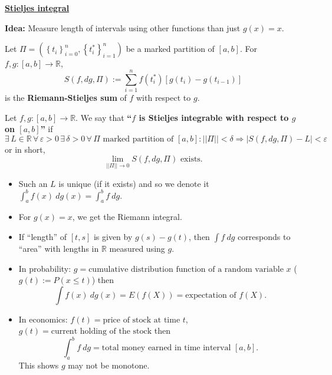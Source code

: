 \documentclass{notes}
\begin{document}
\newpage

{\boldmath \bfseries \underline{Stieljes integral}}

{\boldmath \bfseries Idea:} Measure length of intervals using other functions than just $g(x) = x$.

\begin{defn}
  Let $\Pi = (\left \{ t_i \right \}_{i = 0}^n, \left \{ t^*_i \right \}_{i = 1}^n)$ be a marked partition of $[a, b]$.
  For $f, g \colon [a, b] \to \mathbb R$, 
  \[
    S(f, dg, \Pi) := \sum_{i = 1}^n f(t^*_i) [g(t_i) - g(t_{i - 1})]
  \]
  is the {\boldmath \bfseries Riemann-Stieljes sum} of $f$ with respect to $g$.
\end{defn}

\begin{defn}
  Let $f, g \colon [a, b] \to \mathbb R$.
  We say that {\boldmath \bfseries ``$f$ is Stieljes integrable with respect to $g$ on $[a, b]$''} if 
  \[
    \exists \, L \in \mathbb R \, \forall \, \varepsilon > 0 \, \exists \, \delta > 0 \, \forall \, \Pi \text{ marked partition of $[a, b]$}: ||\Pi|| < \delta \Rightarrow \left | S(f, dg, \Pi) - L \right | < \varepsilon
  \]
  or in short, 
  \[
    \lim_{||\Pi|| \to 0} S(f, dg, \Pi) \text{ exists.}
  \]
\end{defn}

\begin{note}
  \begin{itemize}
    \item Such an $L$ is unique (if it exists) and so we denote it $\int_a^b f(x)\ dg(x) = \int_a^b f\ dg$.

    \item For $g(x) = x$, we get the Riemann integral.
      
    \item If ``length'' of $[t, s]$ is given by $g(s) - g(t)$, then $\int f\ dg$ corresponds to ``area'' with lengths in $\mathbb R$ measured using $g$.
      
    \item In probability: $g = \text{cumulative distribution function of a random variable $x$}$ ($g(t) := P(x \leq t)$) then 
    \[
      \int f(x)\ dg(x) = E(f(X)) = \text{expectation of $f(X)$}.
    \]
    
    \item In economics: $f(t) = \text{price of stock at time $t$}$, $g(t) = \text{current holding of the stock}$ then 
    \[
      \int_a^b f\ dg = \text{total money earned in time interval $[a, b]$.}
    \]
    This shows $g$ may not be monotone.
  \end{itemize}
\end{note}
\end{document}
